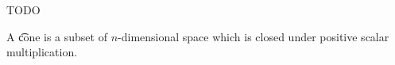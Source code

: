 

TODO


A \t{cone} is a subset of $n$-dimensional space which is closed under positive scalar multiplication.
